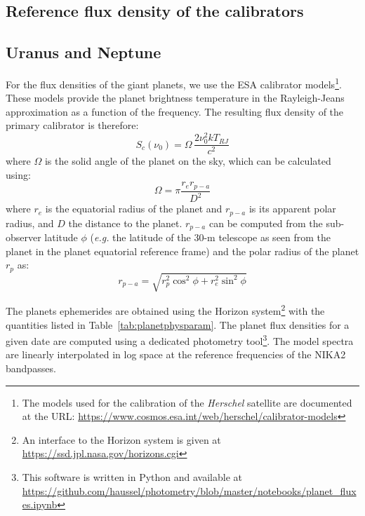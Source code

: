 \documentclass[traditionalabstract]{aa}
\begin{document}
\begin{appendix}
  \section{Reference flux density of the calibrators}
  \label{ap:ref_flux_calibrator}

\subsection{Uranus and Neptune}
\label{se:ref_flux_uranus_neptune}

For the flux densities of the giant planets, we use the ESA calibrator models\footnote{The models used for the calibration of the \emph{Herschel} satellite are documented at the URL: \url{https://www.cosmos.esa.int/web/herschel/calibrator-models}}.
These models provide the planet brightness temperature in the
Rayleigh-Jeans approximation as a function of the frequency. The
resulting flux density of the primary calibrator is therefore: 
\begin{equation}
S_c(\nu_0) = \Omega \, \frac{2 \nu_0^{2} k T_{RJ}}{c^2}
\end{equation}
where $\Omega$ is the solid angle of the planet on the sky, %
which can be calculated using:
%
\begin{equation}
\Omega = \pi \frac{r_{e} r_{p-a}}{D^{2}} 
\label{eq:omega}
\end{equation}
where $r_{e}$ is the equatorial radius of the planet and $r_{p-a}$ is
its apparent polar radius, and $D$ the distance to the
planet. $r_{p-a}$ can be computed from the sub-observer latitude $\phi$
({\it e.g.} the latitude of the 30-m telescope as seen from the planet in the
planet equatorial reference frame) and the polar radius of the
planet $r_{p}$ as:
\begin{equation}
r_{p-a} = \sqrt{r_{p}^2 \cos^{2}\phi + r_{e}^2 \sin^{2} \phi}
\end{equation}

The planets ephemerides are obtained using the
Horizon system\footnote{An interface to the Horizon system is given at \url{https://ssd.jpl.nasa.gov/horizons.cgi}} with the quantities
listed in Table~\ref{tab:planetphysparam}. The planet flux densities for a given date are computed using a dedicated
photometry tool\footnote{This software is written in Python and available at \url{https://github.com/haussel/photometry/blob/master/notebooks/planet_fluxes.ipynb}}. The model spectra are linearly interpolated in log space at the
reference frequencies of the NIKA2 bandpasses. 


\end{appendix}
\end{document}
